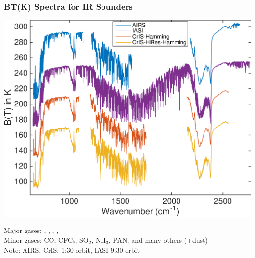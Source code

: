 \documentclass[10pt,t]{beamer}
\begin{document}
\begin{frame}
\frametitle{BT(K) Spectra for IR Sounders}  
\begin{center}
\vspace{-0.1in}
\includegraphics[width=0.75\linewidth]{SunClimate2022/hyperall_hamming.pdf}
\end{center}
\vspace{-0.1in}
\small Major gases: \cd, \water, \ozone, \methane, \nitrous \\
\small Minor gases: CO, CFCs, SO$_2$, NH$_3$, PAN, and many others (+dust) \\
\small Note: AIRS, CrIS: 1:30 orbit, IASI 9:30 orbit
\end{frame}
\end{document}

